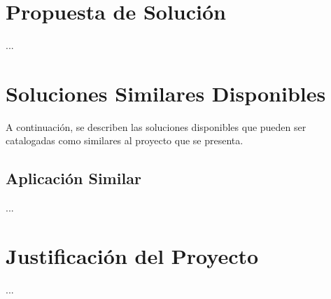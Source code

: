\section{Propuesta de Solución}
...

\section{Soluciones Similares Disponibles}
A continuación, se describen las soluciones disponibles que pueden ser catalogadas como similares al proyecto que se presenta.

\subsection{Aplicación Similar}
...

\section{Justificación del Proyecto}
...
